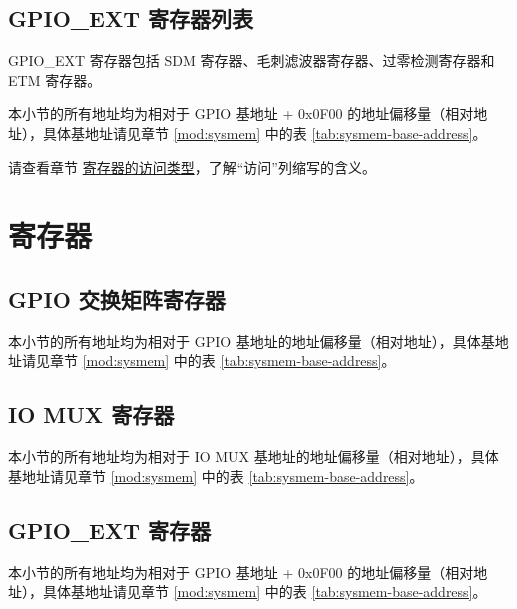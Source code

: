 \documentclass[main\_\_CN.tex]{subfiles}
\begin{document}
\subsection{GPIO\_EXT 寄存器列表}

GPIO\_EXT 寄存器包括 SDM 寄存器、毛刺滤波器寄存器、过零检测寄存器和 ETM 寄存器。

本小节的所有地址均为相对于 GPIO 基地址 + 0x0F00 的地址偏移量（相对地址），具体基地址请见章节 \ref{mod:sysmem} \textit{} 中的表 \ref{tab:sysmem-base-address}。

请查看章节 \hyperref[glossary-access-types]{寄存器的访问类型}，了解“访问”列缩写的含义。




\clearpage
\section{寄存器}

\subsection{GPIO 交换矩阵寄存器}
本小节的所有地址均为相对于 GPIO 基地址的地址偏移量（相对地址），具体基地址请见章节 \ref{mod:sysmem} \textit{} 中的表 \ref{tab:sysmem-base-address}。



\subsection{IO MUX 寄存器}
本小节的所有地址均为相对于 IO MUX 基地址的地址偏移量（相对地址），具体基地址请见章节 \ref{mod:sysmem} \textit{} 中的表 \ref{tab:sysmem-base-address}。



\subsection{GPIO\_EXT 寄存器}

本小节的所有地址均为相对于 GPIO 基地址 + 0x0F00 的地址偏移量（相对地址），具体基地址请见章节 \ref{mod:sysmem} \textit{} 中的表 \ref{tab:sysmem-base-address}。


\end{document}
